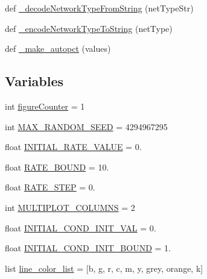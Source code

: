 \begin{DoxyCompactItemize}
def \hyperlink{namespace_mu_mo_t_1_1_mu_mo_t_ac34bd5f10896d28b40c1eaaaab1dd66f}{\+\_\+decode\+Network\+Type\+From\+String} (net\+Type\+Str)
\item 
def \hyperlink{namespace_mu_mo_t_1_1_mu_mo_t_a49af3b04a254110f0064be6a95910533}{\+\_\+encode\+Network\+Type\+To\+String} (net\+Type)
\item 
def \hyperlink{namespace_mu_mo_t_1_1_mu_mo_t_a4820dd5a417c2c593d10deacd3dc1b03}{\+\_\+make\+\_\+autopct} (values)
\end{DoxyCompactItemize}
\subsection*{Variables}
\begin{DoxyCompactItemize}
\item 
int \hyperlink{namespace_mu_mo_t_1_1_mu_mo_t_a4543afee285a2aa1cd5c8c9ca14fe77f}{figure\+Counter} = 1
\item 
int \hyperlink{namespace_mu_mo_t_1_1_mu_mo_t_ae8957aab30c8ae3e6065cd19d166ef22}{M\+A\+X\+\_\+\+R\+A\+N\+D\+O\+M\+\_\+\+S\+E\+ED} = 4294967295
\item 
float \hyperlink{namespace_mu_mo_t_1_1_mu_mo_t_aa168c4a595cabfd7f2af95bcc8c8636f}{I\+N\+I\+T\+I\+A\+L\+\_\+\+R\+A\+T\+E\+\_\+\+V\+A\+L\+UE} = 0.
\item 
float \hyperlink{namespace_mu_mo_t_1_1_mu_mo_t_ad02e9bfc63846779b7b8c5aff0688879}{R\+A\+T\+E\+\_\+\+B\+O\+U\+ND} = 10.
\item 
float \hyperlink{namespace_mu_mo_t_1_1_mu_mo_t_a62b44f6ef63c58313e64af86a7219285}{R\+A\+T\+E\+\_\+\+S\+T\+EP} = 0.
\item 
int \hyperlink{namespace_mu_mo_t_1_1_mu_mo_t_a3911ed84a3973ff4c37bb3bd7d39f22d}{M\+U\+L\+T\+I\+P\+L\+O\+T\+\_\+\+C\+O\+L\+U\+M\+NS} = 2
\item 
float \hyperlink{namespace_mu_mo_t_1_1_mu_mo_t_a432a9028abe35796fd5f4d5b622a57e3}{I\+N\+I\+T\+I\+A\+L\+\_\+\+C\+O\+N\+D\+\_\+\+I\+N\+I\+T\+\_\+\+V\+AL} = 0.
\item 
float \hyperlink{namespace_mu_mo_t_1_1_mu_mo_t_af9f223568146eea48d8f53d7d513bb3d}{I\+N\+I\+T\+I\+A\+L\+\_\+\+C\+O\+N\+D\+\_\+\+I\+N\+I\+T\+\_\+\+B\+O\+U\+ND} = 1.
\item 
list \hyperlink{namespace_mu_mo_t_1_1_mu_mo_t_a0db937f6f99debbdebdfb40c196ddf36}{line\+\_\+color\+\_\+list} = \mbox{[}\textquotesingle{}b\textquotesingle{}, \textquotesingle{}g\textquotesingle{}, \textquotesingle{}r\textquotesingle{}, \textquotesingle{}c\textquotesingle{}, \textquotesingle{}m\textquotesingle{}, \textquotesingle{}y\textquotesingle{}, \textquotesingle{}grey\textquotesingle{}, \textquotesingle{}orange\textquotesingle{}, \textquotesingle{}k\textquotesingle{}\mbox{]}

\end{DoxyCompactItemize}
